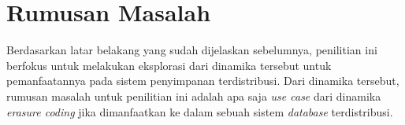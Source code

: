 \section{Rumusan Masalah}

Berdasarkan latar belakang yang sudah dijelaskan sebelumnya, penilitian ini berfokus untuk melakukan eksplorasi dari dinamika tersebut untuk pemanfaatannya pada sistem penyimpanan terdistribusi. Dari dinamika tersebut, rumusan masalah untuk penilitian ini adalah apa saja \textit{use case} dari dinamika \textit{erasure coding} jika dimanfaatkan ke dalam sebuah sistem \textit{database} terdistribusi.

